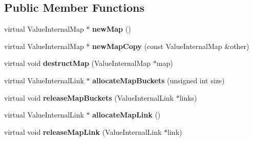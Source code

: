 \subsection*{Public Member Functions}
\begin{DoxyCompactItemize}
\item 
\hypertarget{class_default_value_map_allocator_af58f1000da938b453f499270642db381}{virtual Value\-Internal\-Map $\ast$ {\bfseries new\-Map} ()}\label{class_default_value_map_allocator_af58f1000da938b453f499270642db381}

\item 
\hypertarget{class_default_value_map_allocator_a4edf94de1fe95c7722421694c3ac101f}{virtual Value\-Internal\-Map $\ast$ {\bfseries new\-Map\-Copy} (const Value\-Internal\-Map \&other)}\label{class_default_value_map_allocator_a4edf94de1fe95c7722421694c3ac101f}

\item 
\hypertarget{class_default_value_map_allocator_aa37cddbdf061065dbe6cb12e9de5ac08}{virtual void {\bfseries destruct\-Map} (Value\-Internal\-Map $\ast$map)}\label{class_default_value_map_allocator_aa37cddbdf061065dbe6cb12e9de5ac08}

\item 
\hypertarget{class_default_value_map_allocator_a1dc9a181273b90fa7098313316c53fcf}{virtual Value\-Internal\-Link $\ast$ {\bfseries allocate\-Map\-Buckets} (unsigned int size)}\label{class_default_value_map_allocator_a1dc9a181273b90fa7098313316c53fcf}

\item 
\hypertarget{class_default_value_map_allocator_a45a33b35da50dc69c47dfd31e49c1b0e}{virtual void {\bfseries release\-Map\-Buckets} (Value\-Internal\-Link $\ast$links)}\label{class_default_value_map_allocator_a45a33b35da50dc69c47dfd31e49c1b0e}

\item 
\hypertarget{class_default_value_map_allocator_acc658ce4f2d738fd4db6222c8f89defd}{virtual Value\-Internal\-Link $\ast$ {\bfseries allocate\-Map\-Link} ()}\label{class_default_value_map_allocator_acc658ce4f2d738fd4db6222c8f89defd}

\item 
\hypertarget{class_default_value_map_allocator_ad6998891b5b25c53d28055eed8e4a355}{virtual void {\bfseries release\-Map\-Link} (Value\-Internal\-Link $\ast$link)}\label{class_default_value_map_allocator_ad6998891b5b25c53d28055eed8e4a355}

\end{DoxyCompactItemize}


